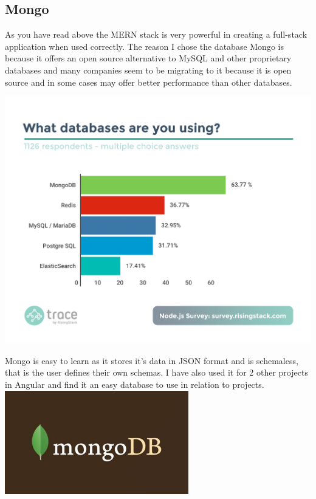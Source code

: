 \subsection{Mongo}
As you have read above the MERN stack is very powerful in creating a full-stack
application when used correctly.  The reason I chose the database Mongo is because
it offers an open source alternative to MySQL and other proprietary databases
\cite{Mongo}
and many companies seem to be migrating to it because it is open source and in
some cases may offer better performance than other databases.
\begin{center}
\includegraphics[width=\textwidth]{img/mongostat.png}
\end{center}
\cite{Survey}
Mongo is easy to learn as it stores it's data in JSON format and is schemaless, that is the user
defines their own schemas. I have also used it for 2 other projects in Angular and find it an
easy database to use in relation to projects.
\includegraphics[width=\textwidth,height=4.5cm]{img/mongo.jpg} \cite{MongoImage}
\\

